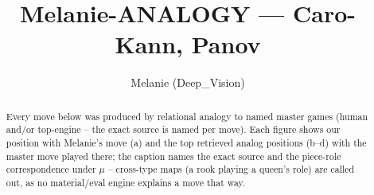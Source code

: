 \documentclass[11pt]{article}
\title{Melanie-ANALOGY — Caro-Kann, Panov}
\author{Melanie (Deep\_Vision)}
\date{}
\begin{document}
\maketitle

\begin{abstract}Every move below was produced by relational analogy to named master games (human and/or top-engine -- the exact source is named per move). Each figure shows our position with Melanie's move (a) and the top retrieved analog positions (b--d) with the master move played there; the caption names the exact source and the piece-role correspondence under $\mu$ -- cross-type maps (a rook playing a queen's role) are called out, as no material/eval engine explains a move that way.\end{abstract}

\begin{figure}[p]\centering
\begin{subfigure}{0.46\textwidth}\centering
\resizebox{\linewidth}{!}{%
\newchessgame
\chessboard[
  setfen={rnbqk2r/pp2bppp/4pn2/3p4/2PP4/2N2N2/PP3PPP/R1BQKB1R w KQkq - 2 7},
  showmover=false,
  pgfstyle=straightmove, color=movearrow, markmove={c4-c5}
]}
\caption{}
\end{subfigure}\hfill
\begin{subfigure}{0.46\textwidth}\centering
\resizebox{\linewidth}{!}{%
\newchessgame
\chessboard[
  setfen={r1bqkb1r/pp3ppp/2n1pn2/3p4/2PP4/2N2N2/PP3PPP/R1BQKB1R w KQkq - 0 7},
  showmover=false,
  pgfstyle=straightmove, color=movearrow, markmove={c4-c5}
]}
\caption{}
\end{subfigure}
\\[4pt]
\begin{subfigure}{0.46\textwidth}\centering
\resizebox{\linewidth}{!}{%
\newchessgame
\chessboard[
  setfen={r1bqkb1r/pp3ppp/2n1pn2/3p4/2PP4/2N2N2/PP3PPP/R1BQKB1R w KQkq - 0 7},
  showmover=false,
  pgfstyle=straightmove, color=movearrow, markmove={c4-c5}
]}
\caption{}
\end{subfigure}\hfill
\begin{subfigure}{0.46\textwidth}\centering
\resizebox{\linewidth}{!}{%
\newchessgame
\chessboard[
  setfen={r1bqkb1r/pp3ppp/2n1pn2/3p4/2PP4/2N2N2/PP3PPP/R1BQKB1R w KQkq - 0 7},
  showmover=false,
  pgfstyle=straightmove, color=movearrow, markmove={c4-c5}
]}
\caption{}
\end{subfigure}

\end{figure}
\end{document}

